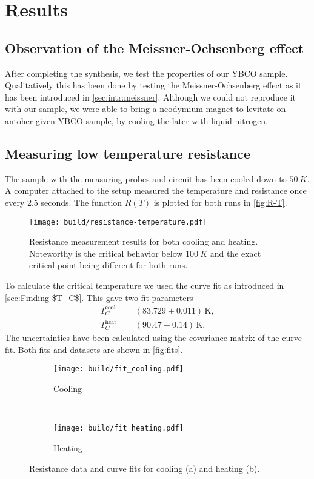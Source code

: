 \section{Results}
\label{sec:results}

\subsection{Observation of the Meissner-Ochsenberg effect}
\label{sec:Observation of the Meissner-Ochsenberg effect}
After completing the synthesis, we test the properties of our YBCO sample. Qualitatively this has
been done by testing the Meissner-Ochsenberg effect as it has been introduced in
\autoref{sec:intr:meissner}. Although we could not reproduce it with our sample, we were able to
bring a neodymium magnet to levitate on antoher given YBCO sample, by cooling the later with liquid
nitrogen.

\subsection{Measuring low temperature resistance}
\label{sec:Measuring low temperature resistance}
The sample with the measuring probes and circuit has been cooled down to $\SI{50}{K}$. A computer
attached to the setup measured the temperature and resistance once every 2.5 seconds. The
function $R(T)$ is plotted for both runs in \autoref{fig:R-T}.
\begin{figure}
  \centering
  \texttt{[image: build/resistance-temperature.pdf]}
  \caption{Resistance measurement results for both cooling and heating. Noteworthy is the critical
  behavior below $\SI{100}{K}$ and the exact critical point being different for both runs.}
  \label{fig:R-T}
\end{figure}
To calculate the critical temperature we used the curve fit as introduced in 
\autoref{sec:Finding $T_C$}. This gave two fit parameters
\begin{align}
  T_C^\text{cool} &= (83.729 \pm 0.011) \, \text{K}, \\
  T_C^\text{heat} &= (90.47 \pm 0.14) \, \text{K}.
\end{align}
The uncertainties have been calculated using the covariance matrix of the curve fit. Both fits and
datasets are shown in \autoref{fig:fits}.
\begin{figure}
     \centering
     \begin{subfigure}[b]{0.5\textwidth}
         \centering
         \texttt{[image: build/fit\_cooling.pdf]}
         \caption{Cooling}
         \label{fig:fit cooling}
     \end{subfigure}
     \\
     \begin{subfigure}[b]{0.5\textwidth}
         \centering
         \texttt{[image: build/fit\_heating.pdf]}
         \caption{Heating}
         \label{fig:fit heating}
     \end{subfigure}
     \caption{Resistance data and curve fits for cooling (a) and  heating (b).}
        \label{fig:fits}
\end{figure}

